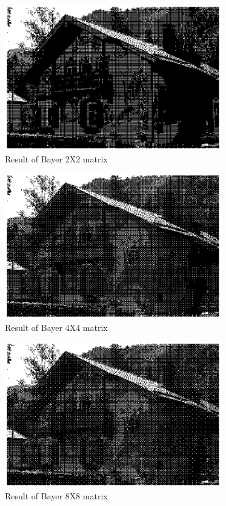 \documentclass[paper=a4, fontsize=11pt]{scrartcl} %
\numberwithin{equation}{section} %
\numberwithin{figure}{section} %
\numberwithin{table}{section} %
\begin{document}
\begin{figure}[H]
	
\centering
\includegraphics[height = 2.5in]{3.eps}
\caption{Result of Bayer 2X2 matrix}
		
		
\end{figure}
\begin{figure}[H]
	
	\centering
	\includegraphics[height = 2.5in]{4.eps}
	\caption{Result of Bayer 4X4 matrix}
	
	
\end{figure}
\begin{figure}[H]
	
	\centering
	\includegraphics[height = 2.5in]{5.eps}
	\caption{Result of Bayer 8X8 matrix}
	
	
\end{figure}
\end{document}
